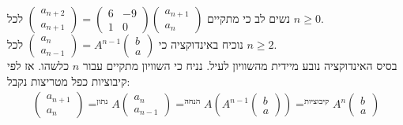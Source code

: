 \documentclass{article}
\DeclareMathOperator*{\equals}{=}
\begin{document}
נשים לב כי מתקיים $\begin{pmatrix}
        a_{n+2} \\
        a_{n+1}
    \end{pmatrix}=\begin{pmatrix}
        6 & -9 \\
        1 & 0
    \end{pmatrix}\begin{pmatrix}
        a_{n+1} \\
        a_{n}
    \end{pmatrix}$ לכל $n\geq 0$. \\
נוכיח באינדוקציה כי $\begin{pmatrix}
        a_{n} \\
        a_{n-1}
    \end{pmatrix}=A^{n-1}\begin{pmatrix}
        b \\
        a
    \end{pmatrix}$ לכל $n\geq 2$. \\
בסיס האינדוקציה נובע מיידית מהשוויון לעיל. נניח כי השוויון מתקיים עבור $n$ כלשהו. אז לפי קיבוציות כפל מטריצות נקבל:
\begin{align*}
    \begin{pmatrix}
        a_{n+1} \\
        a_{n}
    \end{pmatrix}\equals^{\text{נתון}}A\begin{pmatrix}
                                           a_{n} \\
                                           a_{n-1}
                                       \end{pmatrix}\equals^{\text{הנחה}}A(A^{n-1}\begin{pmatrix}
                                                                                      b \\
                                                                                      a
                                                                                  \end{pmatrix})\equals^{\text{קיבוציות}} A^n\begin{pmatrix}
                                                                                                                                 b \\
                                                                                                                                 a
                                                                                                                             \end{pmatrix}
\end{align*}
\end{document}
